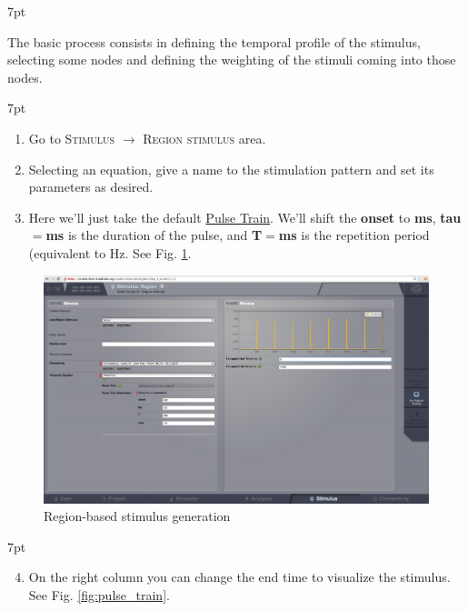 \documentclass{tufte-handout}
\newenvironment{formal}{%
  \def\FrameCommand{%
    \hspace{1pt}%
    {\color{DarkBlue}\vrule width 2pt}%
    {\color{formalshade}\vrule width 4pt}%
    \colorbox{formalshade}%
  }%
  \MakeFramed{\advance\hsize-\width\FrameRestore}%
  \noindent\hspace{-4.55pt}%
  \begin{adjustwidth}{}{7pt}%
  \vspace{2pt}\vspace{2pt}%
}
{%
  \vspace{2pt}\end{adjustwidth}\endMakeFramed%
}
\newenvironment{blah}{%
  \def\FrameCommand{%
    \hspace{1pt}%
    {\color{DarkOrange}\vrule width 2pt}%
    {\color{PeachPuff}\vrule width 4pt}%
    \colorbox{PeachPuff}%
  }%
  \MakeFramed{\advance\hsize-\width\FrameRestore}%
  \noindent\hspace{-4.55pt}%
  \begin{adjustwidth}{}{7pt}%
  \vspace{2pt}\vspace{2pt}%
}
{%
  \vspace{2pt}\end{adjustwidth}\endMakeFramed%
}
\begin{document}
\begin{blah}
The basic process consists in defining the temporal profile of the stimulus,  selecting some nodes and defining the weighting of the stimuli coming
into those nodes.
\end{blah}

\begin{formal}
\begin{enumerate}
\item Go to \textsc{Stimulus} $\rightarrow$ \textsc{Region stimulus} area. 
\item Selecting an equation, give a name to the stimulation pattern and set its parameters as desired.
\item Here we'll just take the default \underline{Pulse Train}. We'll shift the \textbf{onset} to \textbf{ \unit[500]{ms}}, \textbf{tau}$\mathbf{=}$\textbf{\unit[5]{ms}} is the duration of the pulse, and \textbf{T}$\mathbf{=}$\textbf{\unit[500]{ms}} is the repetition period (equivalent to \unit[2]{Hz}.  See Fig. \ref{fig:stimulus_region}.
\end{enumerate}
\end{formal}

\begin{figure}[h]
  \includegraphics[width=\linewidth]{Handout_UI_HeterogenousModelAndStimulation_StimulusRegion}%
  \caption{Region-based stimulus generation}%
  \label{fig:stimulus_region}%
\end{figure}




\begin{formal}
\begin{enumerate}[resume]
\setcounter{enumi}{3}
\item On the right column you can change the end time to visualize the stimulus. See Fig. \ref{fig:pulse_train}.
\end{enumerate}
\end{formal}
\end{document}
